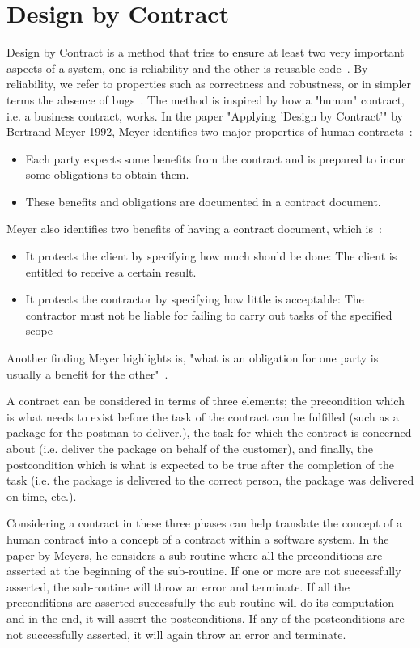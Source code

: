\section{Design by Contract}\label{sec:DbC}

Design by Contract is a method that tries to ensure at least two very important aspects of a system, one is reliability and the other is reusable code~\cite{Bertrand_DbC}.
By reliability, we refer to properties such as correctness and robustness, or in simpler terms the absence of bugs~\cite{Bertrand_DbC}.
The method is inspired by how a "human" contract, i.e. a business contract, works.
In the paper "Applying 'Design by Contract'" by Bertrand Meyer 1992, Meyer identifies two major properties of human contracts~\cite{Bertrand_DbC}:
\begin{itemize}
    \item Each party expects some benefits from the contract and is prepared to incur some obligations to obtain them.
    \item These benefits and obligations are documented in a contract document.
\end{itemize}

Meyer also identifies two benefits of having a contract document, which is~\cite{Bertrand_DbC}:
\begin{itemize}
    \item It protects the client by specifying how much should be done: The client is entitled to receive a certain result.
    \item It protects the contractor by specifying how little is acceptable: The contractor must not be liable for failing to carry out tasks of the specified scope
\end{itemize}

Another finding Meyer highlights is, "what is an obligation for one party is usually a benefit for the other"~\cite{Bertrand_DbC}.

A contract can be considered in terms of three elements; the precondition which is what needs to exist before the task of the contract can be fulfilled (such as a package for the postman to deliver.), the task for which the contract is concerned about (i.e. deliver the package on behalf of the customer), and finally, the postcondition which is what is expected to be true after the completion of the task (i.e. the package is delivered to the correct person, the package was delivered on time, etc.).

Considering a contract in these three phases can help translate the concept of a human contract into a concept of a contract within a software system.
In the paper by Meyers, he considers a sub-routine where all the preconditions are asserted at the beginning of the sub-routine.
If one or more are not successfully asserted, the sub-routine will throw an error and terminate. 
If all the preconditions are asserted successfully the sub-routine will do its computation and in the end, it will assert the postconditions. 
If any of the postconditions are not successfully asserted, it will again throw an error and terminate.

